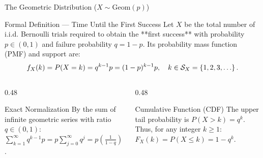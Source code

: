 \documentclass[aspectratio=169,xcolor={dvipsnames,table}]{beamer}
\begin{document}
\begin{frame}{The Geometric Distribution ($X \sim \text{Geom}(p)$)}
	\begin{block}{Formal Definition --- Time Until the First Success}
		\small
		Let $X$ be the total number of i.i.d. Bernoulli trials required to obtain the **first success** with probability $p \in (0, 1)$ and failure probability $q = 1-p$. Its probability mass function (PMF) and support are:
		\begin{align*}
			f_X(k) = P(X = k) = q^{k-1}p = (1-p)^{k-1}p, \quad k \in \mathcal{S}_X = \set{1, 2, 3, \dots}.
		\end{align*}
	\end{block}
	\vspace{-0.15cm}
	\begin{columns}[T]
		\begin{column}{0.48\textwidth}
			\begin{exampleblock}{Exact Normalization}
				\footnotesize
				By the sum of infinite geometric series with ratio $q \in (0, 1)$:
				$\sum_{k=1}^{\infty} q^{k-1}p = p \sum_{j=0}^{\infty} q^j = p \left(\frac{1}{1-q}\right) = \frac{p}{p} = 1$.
			\end{exampleblock}
		\end{column}
		\begin{column}{0.48\textwidth}
			\begin{alertblock}{Cumulative Function (CDF)}
				\footnotesize
				The upper tail probability is $P(X > k) = q^k$. Thus, for any integer $k \ge 1$:
				$F_X(k) = P(X \le k) = 1 - q^k$.
			\end{alertblock}
		\end{column}
	\end{columns}
\end{frame}
\end{document}
